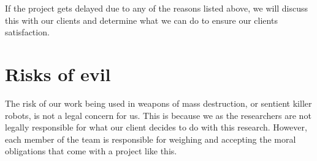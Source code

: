 If the project gets delayed due to any of the reasons listed above, we will
discuss this with our clients and determine what we can do to ensure our
clients satisfaction.

\section{Risks of evil}

The risk of our work being used in weapons of mass destruction, or sentient
killer robots, is not a legal concern for us. This is because we as the
researchers are not legally responsible for what our client decides to do with
this research.
\justify
However, each member of the team is responsible for weighing and accepting the
moral obligations that come with a project like this.
